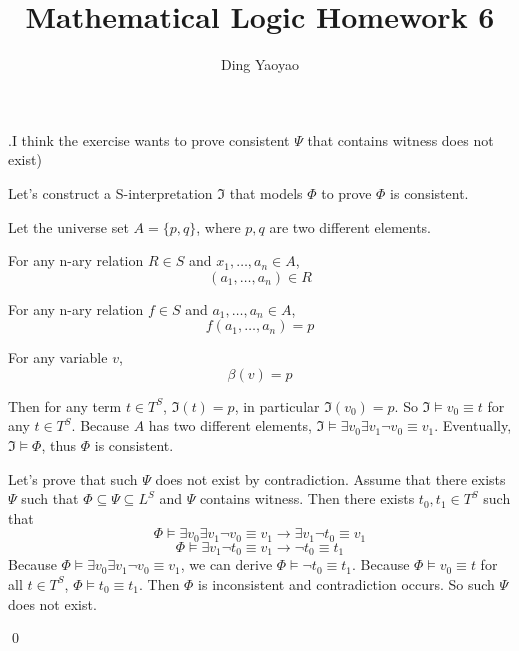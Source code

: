\documentclass[10pt,a4paper]{article}
\author{Ding Yaoyao}
\title{Mathematical Logic Homework 6}
\newenvironment{sol}[1]
{\par\vspace{3mm}\noindent{\it Solution #1}.}
{\qed}
\begin{document}
	\maketitle
	
	\begin{sol}{6.1} %
		(I think the exercise wants to prove consistent $\Psi$ that contains witness does not exist)
		
		Let's construct a S-interpretation $\mathfrak{I}$ that models $\Phi$ to prove $\Phi$ is consistent. 
		
		Let the universe set $A = \{p, q\}$, where $p,q$ are two different elements.
		
		For any n-ary relation $R \in S$ and $x_1,\dots,a_n \in A$,
		$$
			(a_1,\dots,a_n) \in R
		$$
		
		For any n-ary relation $f \in S$ and $a_1,\dots,a_n \in A$,
		$$
			f(a_1,\dots,a_n) = p
		$$
		
		For any variable $v$, 
		$$
			\beta(v) = p
		$$
		
		Then for any term $t \in T^S$, $\mathfrak{I}(t) = p$, in particular $\mathfrak{I}(v_0) = p$. So $\mathfrak{I} \models v_0 \equiv t$ for any $t \in T^S$. Because $A$ has two different elements, $\mathfrak{I}\models \exists v_0\exists v_1 \neg v_0 \equiv v_1$. Eventually, $\mathfrak{I} \models \Phi$, thus $\Phi$ is consistent. 
		
		Let's prove that such $\Psi$ does not exist by contradiction. Assume that there exists $\Psi$ such that $\Phi \subseteq \Psi \subseteq L^S$ and $\Psi$ contains witness. Then there exists $t_0, t_1 \in T^S$ such that 
		$$
			\Phi \models  \exists v_0 \exists v_1 \neg v_0 \equiv v_1 \rightarrow \exists v_1 \neg t_0 \equiv v_1 
		$$
		$$
			\Phi \models  \exists v_1 \neg t_0 \equiv v_1 \rightarrow \neg t_0 \equiv t_1
		$$
		Because $\Phi \models \exists v_0 \exists v_1 \neg v_0 \equiv v_1$, we can derive $\Phi \models \neg t_0 \equiv t_1$. Because $\Phi \models v_0 \equiv t$ for all $t \in T^S$, $\Phi \models t_0 \equiv t_1$. Then $\Phi$ is inconsistent and contradiction occurs. So such $\Psi$ does not exist.
		
	\end{sol} 
\end{document}
